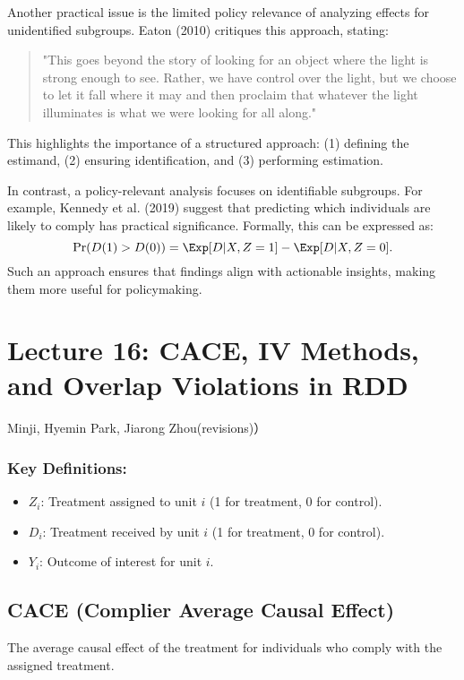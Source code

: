 Another practical issue is the limited policy relevance of analyzing effects for unidentified subgroups. Eaton (2010) critiques this approach, stating:  
\begin{quote}  
"This goes beyond the story of looking for an object where the light is strong enough to see. Rather, we have control over the light, but we choose to let it fall where it may and then proclaim that whatever the light illuminates is what we were looking for all along."  
\end{quote}  
This highlights the importance of a structured approach: (1) defining the estimand, (2) ensuring identification, and (3) performing estimation.  

In contrast, a policy-relevant analysis focuses on identifiable subgroups. For example, Kennedy et al. (2019) suggest that predicting which individuals are likely to comply has practical significance. Formally, this can be expressed as:  
\[
\Pr(D(1) > D(0)) = \Exp[D | X, Z = 1] - \Exp[D | X, Z = 0].  
\]  
Such an approach ensures that findings align with actionable insights, making them more useful for policymaking.  

\section{Lecture 16: CACE, IV Methods, and Overlap Violations in RDD }{Minji, Hyemin Park, Jiarong Zhou(revisions)）}



\subsubsection{Key Definitions:}
\begin{itemize}
    \item \( Z_i \): Treatment assigned to unit \( i \) (1 for treatment, 0 for control).
    \item \( D_i \): Treatment received by unit \( i \) (1 for treatment, 0 for control).
    \item \( Y_i \): Outcome of interest for unit \( i \).
\end{itemize}

\subsection{CACE (Complier Average Causal Effect)}
 The average causal effect of the treatment for individuals who comply with the assigned treatment. 

